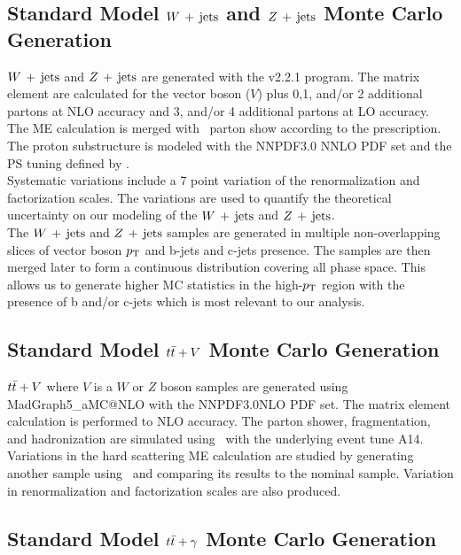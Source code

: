 \subsection{Standard Model $W\,+\,\mathrm{jets}$ and $Z\,+\,\mathrm{jets}$ Monte Carlo Generation}

\indent $W\,+\,\mathrm{jets}$ and $Z\,+\,\mathrm{jets}$ are generated with the \sherpa v2.2.1 program.\cite{sherpa}  The matrix element are calculated for the vector boson ($V$) plus 0,1, and/or 2 additional partons at NLO accuracy and 3, and/or 4 additional partons at LO accuracy.  \\

\indent The ME calculation is merged with \sherpa\ parton show according to the  prescription.  The proton substructure is modeled with the NNPDF3.0 NNLO PDF set and the PS tuning defined by \sherpa.  \\

\indent  Systematic variations include a 7 point variation of the renormalization and factorization scales.  The variations are used to quantify the theoretical uncertainty on our modeling of the $W\,+\,\mathrm{jets}$ and $Z\,+\,\mathrm{jets}$. \\

\indent  The $W\,+\,\mathrm{jets}$ and $Z\,+\,\mathrm{jets}$ samples are generated in multiple non-overlapping slices of vector boson $p_{\mathrm{T}}$ and b-jets and c-jets presence.  The samples are then merged later to form a continuous distribution covering all phase space.  This allows us to generate higher MC statistics in the high-$p_{\mathrm{T}}$ region with the presence of b and/or c-jets which is most relevant to our analysis. \\

\subsection{Standard Model $t\bar{t}+V$ Monte Carlo Generation}

\indent $t\bar{t}+V$ where $V$ is a $W$ or $Z$ boson samples are generated using {\sc MadGraph5\_aMC\/@NLO} with the NNPDF3.0NLO PDF set. The matrix element calculation is performed to NLO accuracy. The parton shower, fragmentation, and hadronization are simulated using \pythiaeight\ with the underlying event tune A14.  Variations in the hard scattering ME calculation are studied by generating another sample using \sherpa\ and comparing its results to the nominal sample.  Variation in renormalization and factorization scales are also produced. \\

\subsection{Standard Model $t\bar{t}+\gamma$ Monte Carlo Generation}

